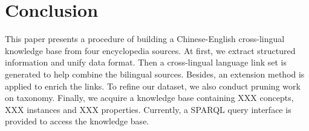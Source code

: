 \documentclass[runningheads,a4paper]{llncs}
\begin{document}

\section{Conclusion}
\label{sec:con}
This paper presents a procedure of building a Chinese-English cross-lingual knowledge base from four encyclopedia sources. At first, we extract structured information and unify data format. Then a cross-lingual language link set is generated to help combine the bilingual sources. Besides, an extension method is applied to enrich the links. To refine our dataset, we also conduct pruning work on taxonomy. Finally, we acquire a knowledge base containing XXX concepts, XXX instances and XXX properties. Currently, a SPARQL query interface is provided to access the knowledge base. 





\end{document}
